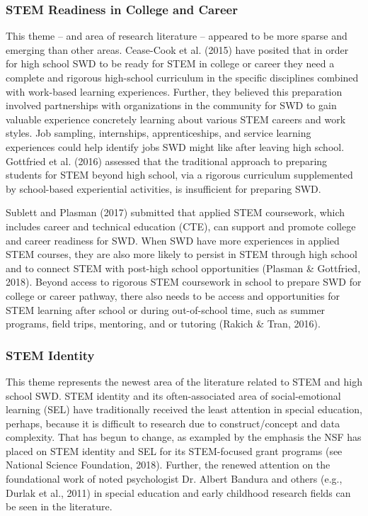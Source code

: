 \documentclass[11.5pt]{sig-alternate}
\begin{document}
\begin{large}
\subsubsection*{STEM Readiness in College and Career}
This theme – and area of research literature – appeared to be more sparse and emerging than other areas. Cease-Cook et al. (2015) have posited that in order for high school SWD to be ready for STEM in college or career they need a complete and rigorous high-school curriculum in the specific disciplines combined with work-based learning experiences. Further, they believed this preparation involved partnerships with organizations in the community for SWD to gain valuable experience concretely learning about various STEM careers and work styles. Job sampling, internships, apprenticeships, and service learning experiences could help identify jobs SWD might like after leaving high school. Gottfried et al. (2016) assessed that the traditional approach to preparing students for STEM beyond high school, via a rigorous curriculum supplemented by school-based experiential activities, is insufficient for preparing SWD. 

Sublett and Plasman (2017) submitted that applied STEM coursework, which includes career and technical education (CTE), can support and promote college and career readiness for SWD. When SWD have more experiences in applied STEM courses, they are also more likely to persist in STEM through high school and to connect STEM with post-high school opportunities (Plasman \& Gottfried, 2018). Beyond access to rigorous STEM coursework in school to prepare SWD for college or career pathway, there also needs to be access and opportunities for STEM learning after school or during out-of-school time, such as summer programs, field trips, mentoring, and or tutoring (Rakich \& Tran, 2016). 

\subsubsection*{STEM Identity}

This theme represents the newest area of the literature related to STEM and high school SWD. STEM identity and its often-associated area of social-emotional learning (SEL) have traditionally received the least attention in special education, perhaps, because it is difficult to research due to construct/concept and data complexity. That has begun to change, as exampled by the emphasis the NSF has placed on STEM identity and SEL for its STEM-focused grant programs (see National Science Foundation, 2018). Further, the renewed attention on the foundational work of noted psychologist Dr. Albert Bandura and others (e.g., Durlak et al., 2011) in special education and early childhood research fields can be seen in the literature.    


\end{large}
\end{document}
